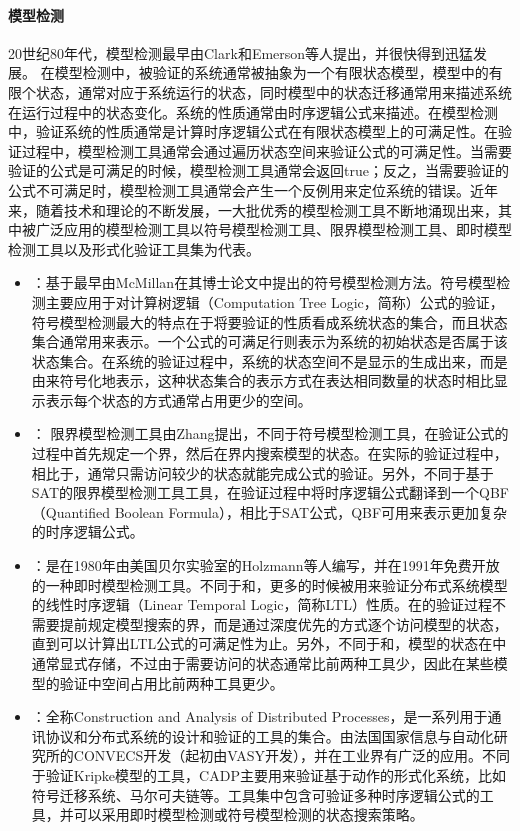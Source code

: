 \paragraph{模型检测}
20世纪80年代，模型检测\cite{CGP01,BouajjaniJNT00,BaierKatoen08}最早由Clark和Emerson等人提出，并很快得到迅猛发展。
在模型检测中，被验证的系统通常被抽象为一个有限状态模型，模型中的有限个状态，通常对应于系统运行的状态，同时模型中的状态迁移通常用来描述系统在运行过程中的状态变化。系统的性质通常由时序逻辑公式来描述。在模型检测中，验证系统的性质通常是计算时序逻辑公式在有限状态模型上的可满足性。在验证过程中，模型检测工具通常会通过遍历状态空间来验证公式的可满足性。当需要验证的公式是可满足的时候，模型检测工具通常会返回true；反之，当需要验证的公式不可满足时，模型检测工具通常会产生一个反例用来定位系统的错误。近年来，随着技术和理论的不断发展，一大批优秀的模型检测工具不断地涌现出来，其中被广泛应用的模型检测工具以符号模型检测工具\nusmv{}\cite{CimattiCGR99}、限界模型检测工具\verds{}\cite{Zhang14}、即时模型检测工具\cite{Holzmann97}以及形式化验证工具集\CADP{}\cite{GaravelLMS13}为代表。
\begin{itemize}
	\item \nusmv{}：\nusmv{}基于最早由McMillan在其博士论文\cite{mcmillan93}中提出的符号模型检测方法。符号模型检测主要应用于对计算树逻辑（Computation Tree Logic，简称\CTL{}）公式的验证，符号模型检测最大的特点在于将要验证的性质看成系统状态的集合，而且状态集合通常用\BDD{}\cite{Bryant86}来表示。一个\CTL{}公式的可满足行则表示为系统的初始状态是否属于该状态集合。在系统的验证过程中，系统的状态空间不是显示的生成出来，而是由\BDD{}来符号化地表示，这种状态集合的表示方式在表达相同数量的状态时相比显示表示每个状态的方式通常占用更少的空间。
	\item \verds{}：
	限界模型检测工具\verds{}由Zhang提出，不同于符号模型检测工具，\verds{}在验证公式的过程中首先规定一个界，然后在界内搜索模型的状态。在实际的验证过程中，相比于\nusmv{}，\verds{}通常只需访问较少的状态就能完成公式的验证。另外，不同于基于\textsf{SAT}\cite{BCCZ99}的限界模型检测工具工具，\verds{}在验证过程中将时序逻辑公式翻译到一个\textsf{QBF}（Quantified Boolean Formula），相比于\textsf{SAT}公式，\textsf{QBF}可用来表示更加复杂的时序逻辑公式。
	\item {}：是在1980年由美国贝尔实验室的Holzmann等人编写，并在1991年免费开放的一种即时模型检测工具。不同于\nusmv{}和\verds{}，更多的时候被用来验证分布式系统模型的线性时序逻辑（Linear Temporal Logic，简称\textsf{LTL}）性质。在的验证过程不需要提前规定模型搜索的界，而是通过深度优先的方式逐个访问模型的状态，直到可以计算出\textsf{LTL}公式的可满足性为止。另外，不同于\nusmv{}和\verds{}，模型的状态在中通常显式存储，不过由于需要访问的状态通常比前两种工具少，因此在某些模型的验证中空间占用比前两种工具更少。
	\item {}：全称Construction and Analysis of Distributed Processes，是一系列用于通讯协议和分布式系统的设计和验证的工具的集合。由法国国家信息与自动化研究所的\textsf{CONVECS}开发（起初由\textsf{VASY}开发），并在工业界有广泛的应用。不同于验证Kripke模型的工具，\textsf{CADP}主要用来验证基于动作的形式化系统，比如符号迁移系统、马尔可夫链等。\CADP{}工具集中包含可验证多种时序逻辑公式的工具，并可以采用即时模型检测或符号模型检测的状态搜索策略。
\end{itemize}

